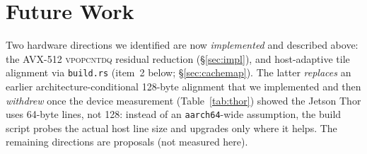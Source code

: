 \documentclass[11pt]{article}
\theoremstyle{plain}
\theoremstyle{definition}
\begin{document}
\section{Future Work}
\label{sec:future}
Two hardware directions we identified are now \emph{implemented} and described
above: the AVX-512 \textsc{vpopcntdq} residual reduction (\S\ref{sec:impl}),
and host-adaptive tile alignment via \texttt{build.rs} (item~2 below;
\S\ref{sec:cachemap}). The latter \emph{replaces} an earlier
architecture-conditional 128-byte alignment that we implemented and then
\emph{withdrew} once the device measurement (Table~\ref{tab:thor}) showed the
Jetson Thor uses 64-byte lines, not 128: instead of an \texttt{aarch64}-wide
assumption, the build script probes the actual host line size and upgrades only
where it helps. The remaining directions are proposals (not measured here).
\end{document}
